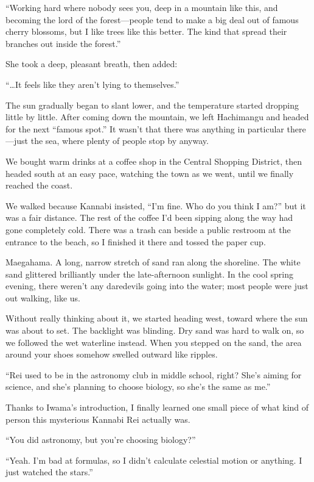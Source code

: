 \documentclass[
    a4paper,
    12pt,
    twoside,
    openany,
    UTF8,
    fontset=windows
]{ctexbook}
\begin{document}
``Working hard where nobody sees you, deep in a mountain like this, and becoming the lord of the forest---people tend to make a big deal out of famous cherry blossoms, but I like trees like this better. The kind that spread their branches out inside the forest.''

She took a deep, pleasant breath, then added:

``\dots It feels like they aren't lying to themselves.''

The sun gradually began to slant lower, and the temperature started dropping little by little. After coming down the mountain, we left Hachimangu and headed for the next ``famous spot.'' It wasn't that there was anything in particular there---just the sea, where plenty of people stop by anyway.

We bought warm drinks at a coffee shop in the Central Shopping District, then headed south at an easy pace, watching the town as we went, until we finally reached the coast.

We walked because Kannabi insisted, ``I'm fine. Who do you think I am?'' but it was a fair distance. The rest of the coffee I'd been sipping along the way had gone completely cold. There was a trash can beside a public restroom at the entrance to the beach, so I finished it there and tossed the paper cup.

Maegahama. A long, narrow stretch of sand ran along the shoreline. The white sand glittered brilliantly under the late-afternoon sunlight. In the cool spring evening, there weren't any daredevils going into the water; most people were just out walking, like us.

Without really thinking about it, we started heading west, toward where the sun was about to set. The backlight was blinding. Dry sand was hard to walk on, so we followed the wet waterline instead. When you stepped on the sand, the area around your shoes somehow swelled outward like ripples.

``Rei used to be in the astronomy club in middle school, right? She's aiming for science, and she's planning to choose biology, so she's the same as me.''

Thanks to Iwama's introduction, I finally learned one small piece of what kind of person this mysterious Kannabi Rei actually was.

``You did astronomy, but you're choosing biology?''

``Yeah. I'm bad at formulas, so I didn't calculate celestial motion or anything. I just watched the stars.''
\end{document}

